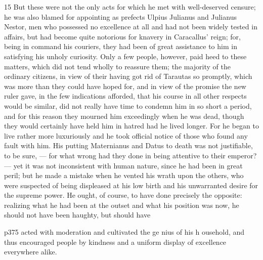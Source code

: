 15
But these were not the only acts for which he met with well-deserved censure; he was also blamed for appointing as prefects Ulpius Julianus and Julianus Nestor, men who possessed no excellence at all and had not been widely tested in affairs, but had become quite notorious for knavery in Caracallus' reign; for, being in command his couriers, they had been of great assistance to him in satisfying his unholy curiosity. Only a few people, however, paid heed to these matters, which did not tend wholly to reassure them; the majority of the ordinary citizens, in view of their having got rid of Tarautas so promptly, which was more than they could have hoped for, and in view of the promise the new ruler gave, in the few indications afforded, that his course in all other respects would be similar, did not really have time to condemn him in so short a period, and for this reason they mourned him exceedingly when he was dead, though they would certainly have held him in hatred had he lived longer. For he began to live rather more luxuriously and he took official notice of those who found any fault with him. His putting Maternianus and Datus to death was not justifiable, to be sure, \texthebrew{—} for what wrong had they done in being attentive to their emperor? \texthebrew{—} yet it was not inconsistent with human nature, since he had been in great peril; but he made a mistake when he vented his wrath upon the others, who were suspected of being displeased at his low birth and his unwarranted desire for the supreme power. He ought, of course, to have done precisely the opposite: realizing what he had been at the outset and what his position was now, he should not have been haughty, but should have

p375 acted with moderation and cultivated the ge nius of his h ousehold, and thus encouraged people by kindness and a uniform display of excellence everywhere alike.

